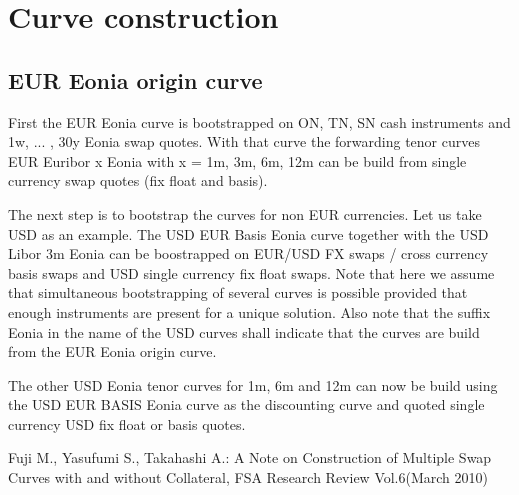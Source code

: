 \documentclass{amsart}
\theoremstyle{plain}
\numberwithin{equation}{section}
\begin{document}
\section{Curve construction}

\subsection{EUR Eonia origin curve}

First the EUR Eonia curve is bootstrapped on ON, TN, SN cash instruments and 1w, ... , 30y Eonia swap quotes. With that curve the forwarding tenor curves EUR Euribor x Eonia with x = 1m, 3m, 6m, 12m can be build from single currency swap quotes (fix float and basis).

The next step is to bootstrap the curves for non EUR currencies. Let us take USD as an example. The USD EUR Basis Eonia curve together with the USD Libor 3m Eonia can be boostrapped on EUR/USD FX swaps / cross currency basis swaps and USD single currency fix float swaps. Note that here we assume that simultaneous bootstrapping of several curves is possible provided that enough instruments are present for a unique solution. Also note that the suffix Eonia in the name of the USD curves shall indicate that the curves are build from the EUR Eonia origin curve.

The other USD Eonia tenor curves for 1m, 6m and 12m can now be build using the USD EUR BASIS Eonia curve as the discounting curve and quoted single currency USD fix float or basis quotes.


\begin{thebibliography}{1}

Fuji M., Yasufumi S., Takahashi A.:  A Note on Construction of Multiple Swap Curves with and without Collateral, FSA Research Review Vol.6(March 2010)

\end{thebibliography}
\end{document}
